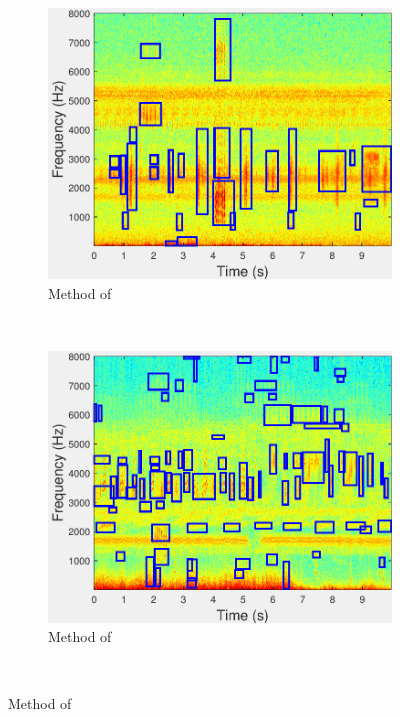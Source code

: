 \begin{figure}
               \begin{subfigure}[b]{0.35\textwidth}
                \includegraphics[width=\textwidth]{image/Ch7/AED_Michael.pdf}
                \caption{Method of \cite{Michael2011}}
        \end{subfigure}  
        ~  
                \begin{subfigure}[b]{0.35\textwidth}
                \includegraphics[width=\textwidth]{image/Ch7/AED_Michael_2.pdf}
                \caption{Method of \cite{Michael2011}}
        \end{subfigure}%
\\         

\end{figure}
